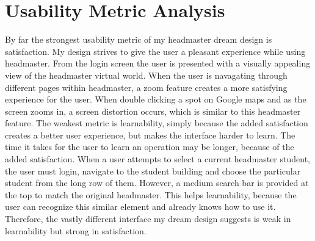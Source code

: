 \documentclass[11pt]{article}
\begin{document}
\section{Usability Metric Analysis}
By far the strongest usability metric of my headmaster dream design is satisfaction. My design strives to give the user a pleasant experience while using headmaster. From the login screen the user is presented with a visually appealing view of the headmaster virtual world. When the user is navagating through different pages within headmaster, a zoom feature creates a more satisfying experience for the user. When double clicking a spot on Google maps and as the screen zooms in, a screen distortion occurs, which is similar to this headmaster feature.
The weakest metric is learnability, simply because the added satisfaction creates a better user experience, but makes the interface harder to learn. The time it takes for the user to learn an operation may be longer, because of the added satisfaction. When a user attempts to select a current headmaster student, the user must login, navigate to the student building and choose the particular student from the long row of them. However, a medium search bar is provided at the top to match the original headmaster. This helps learnability, because the user can recognize this similar element and already knows how to use it. Therefore, the vastly different interface my dream design suggests is weak in learnability but strong in satisfaction.
\end{document}
